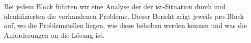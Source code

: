 Bei jedem Block führten wir eine Analyse der der ist-Situation durch und identifizierten die vorhandenen Probleme. 
Dieser Bericht zeigt jeweils pro Block auf, wo die Problemstellen liegen, wie diese behoben werden können und was die Anforderungen an die Lösung ist.

\newpage


